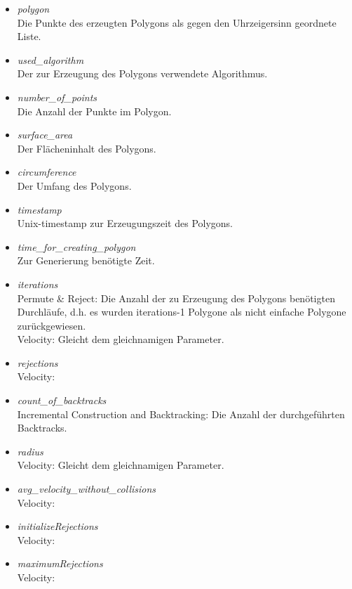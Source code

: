     \begin{itemize}
      \item \emph{polygon}\\
        Die Punkte des erzeugten Polygons als gegen den Uhrzeigersinn geordnete 
        Liste.
      \item \emph{used\_algorithm}\\
        Der zur Erzeugung des Polygons verwendete Algorithmus.
      \item \emph{number\_of\_points}\\
        Die Anzahl der Punkte im Polygon.
      \item \emph{surface\_area}\\
        Der Flächeninhalt des Polygons.
      \item \emph{circumference}\\
        Der Umfang des Polygons.
      \item \emph{timestamp}\\
        Unix-timestamp zur Erzeugungszeit des Polygons.
      \item \emph{time\_for\_creating\_polygon}\\
        Zur Generierung benötigte Zeit.
      \item \emph{iterations}\\
        Permute \& Reject: Die Anzahl der zu Erzeugung des Polygons benötigten 
        Durchläufe, d.h. es wurden iterations-1 Polygone als nicht einfache 
        Polygone zurückgewiesen.\\
        Velocity: Gleicht dem gleichnamigen Parameter.
      \item \emph{rejections}\\
        Velocity:
      \item \emph{count\_of\_backtracks}\\
        Incremental Construction and Backtracking: Die Anzahl der 
        durchgeführten Backtracks.
      \item \emph{radius}\\
        Velocity: Gleicht dem gleichnamigen Parameter.
      \item \emph{avg\_velocity\_without\_collisions}\\
        Velocity:
      \item \emph{initializeRejections}\\
        Velocity:
      \item \emph{maximumRejections}\\
        Velocity:
    \end{itemize}

